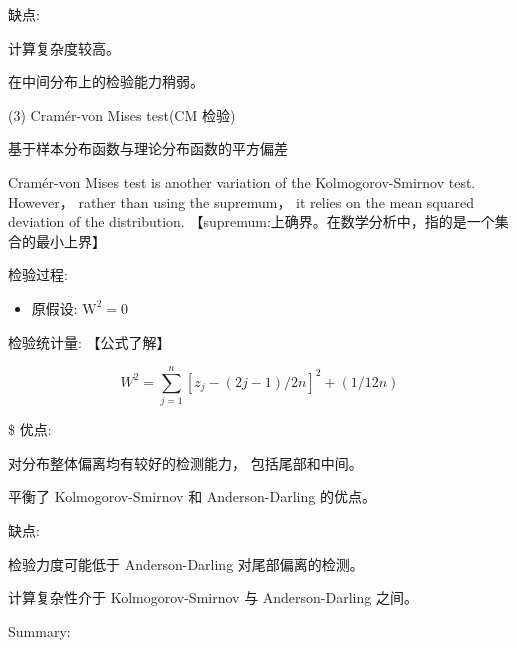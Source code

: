      缺点:
    
    计算复杂度较高。
    
    在中间分布上的检验能力稍弱。
    
    (3) Cramér-von Mises test(CM 检验)
    
     基于样本分布函数与理论分布函数的平方偏差
    
     Cramér-von Mises test is another variation of the Kolmogorov-Smirnov test. However， rather than using the supremum， it relies on the mean squared deviation of the distribution. 【supremum:上确界。在数学分析中，指的是一个集合的最小上界】
    
     检验过程:
    
    \begin{itemize}
    \item 原假设: \({\mathrm{W}}^{2} = 0\)
    \end{itemize}
    
    检验统计量: 【公式了解】
    
    \[
    {W}^{2} = \mathop{\sum }\limits_{{j = 1}}^{n}{\left\lbrack  {z}_{j} - \left( 2j - 1\right) /2n\right\rbrack  }^{2} + \left( {1/{12n}}\right)
    \]
    
    \$ 优点:
    
    对分布整体偏离均有较好的检测能力， 包括尾部和中间。
    
    平衡了 Kolmogorov-Smirnov 和 Anderson-Darling 的优点。
    
     缺点:
    
    检验力度可能低于 Anderson-Darling 对尾部偏离的检测。
    
    计算复杂性介于 Kolmogorov-Smirnov 与 Anderson-Darling 之间。
    
    Summary:
    
    \begin{center}
    \end{center}


